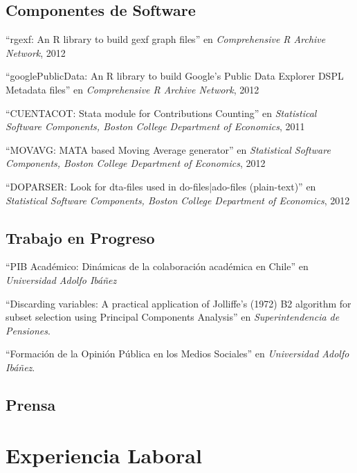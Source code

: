 \documentclass[letterpaper, 12pt]{article}
\renewenvironment{itemize}{
  \begin{list}{}{
    \setlength{\leftmargin}{0.45cm}
  }
}{
  \end{list}
}
\begin{document}
\subsection*{Componentes de Software}
\begin{itemize}
\item ``rgexf: An R library to build gexf graph files'' en {\it Comprehensive R Archive Network}, 2012
\item ``googlePublicData: An R library to build Google's Public Data Explorer DSPL Metadata files'' en {\it Comprehensive R Archive Network}, 2012
\item ``CUENTACOT: Stata module for Contributions Counting'' en {\it Statistical Software Components, Boston College Department of Economics}, 2011
\item ``MOVAVG: MATA based Moving Average generator'' en {\it Statistical Software Components, Boston College Department of Economics}, 2012
\item ``DOPARSER: Look for dta-files used in do-files|ado-files (plain-text)'' en {\it Statistical Software Components, Boston College Department of Economics}, 2012
\end{itemize}

\subsection*{Trabajo en Progreso}
\begin{itemize}
\item ``PIB Académico: Dinámicas de la colaboración académica en Chile'' en {\it Universidad Adolfo Ibáñez}
\item ``Discarding variables: A practical application of Jolliffe's (1972) B2 algorithm for subset selection using Principal Components Analysis'' en {\it Superintendencia de Pensiones}.
\item ``Formación de la Opinión Pública en los Medios Sociales'' en {\it Universidad Adolfo Ibáñez}.
\end{itemize}

\subsection*{Prensa}

\section*{Experiencia Laboral}
\end{document}

